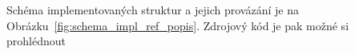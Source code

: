 Schéma implementovaných struktur a jejich provázání je na Obrázku~\ref{fig:schema_impl_ref_popis}.
Zdrojový kód je pak možné si prohlédnout

% 


